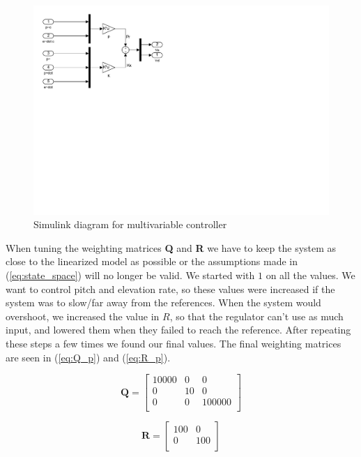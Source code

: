 \begin{figure}[h!]
	\centering
	\includegraphics[scale=0.8, trim={0 12cm 16cm 0}, clip]{images/simulink/P3.pdf}
	\caption{Simulink diagram for multivariable controller}
    \label{fig:simulink_multivariabe}
\end{figure}


When tuning the weighting matrices \textbf{Q} and \textbf{R} we have to  keep the system as close to the linearized model as possible or the assumptions made in (\ref{eq:state_space}) will no longer be valid. We started with $1$ on all the values. We want to control pitch and elevation rate, so these values were increased if the system was to slow/far away from the references. When the system would overshoot, we increased the value in $R$, so that the regulator can't use as much input, and lowered them when they failed to reach the reference. After repeating these steps a few times we found our final values. The final weighting matrices are seen in (\ref{eq:Q_p}) and (\ref{eq:R_p}). 

\begin{equation} \label{eq:Q_p}
    \bm{Q} = 
	\begin{bmatrix}
		10000 & 0     & 0\\
		0     & 10    & 0\\
		0     & 0     & 100000\\
	\end{bmatrix}
\end{equation} 

\begin{equation} \label{eq:R_p}
    \bm{R} = 
	\begin{bmatrix}
		100   & 0  \\
		0     & 100\\
	\end{bmatrix}
\end{equation} 


